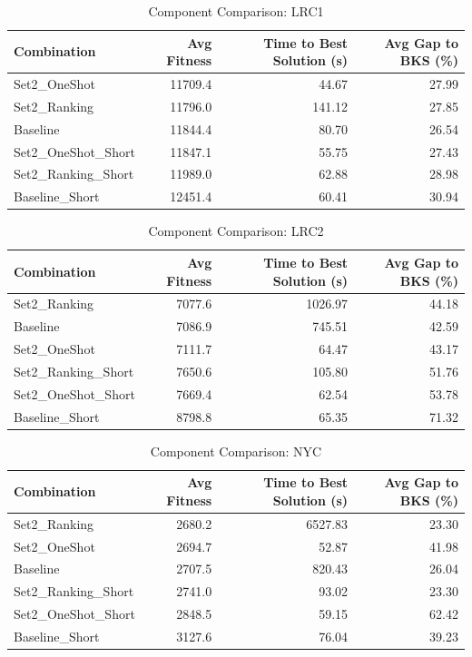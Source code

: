 \documentclass{article}
\begin{document}
\begin{table}[htbp]
\centering
\caption{Component Comparison: LRC1}
\label{tab:comparison_lrc1}
\begin{tabular}{lrrr}
\toprule
Combination & Avg Fitness & Time to Best Solution (s) & Avg Gap to BKS (\%) \\
\midrule
Set2\_OneShot & 11709.4 & 44.67 & 27.99 \\
Set2\_Ranking & 11796.0 & 141.12 & 27.85 \\
Baseline & 11844.4 & 80.70 & 26.54 \\
Set2\_OneShot\_Short & 11847.1 & 55.75 & 27.43 \\
Set2\_Ranking\_Short & 11989.0 & 62.88 & 28.98 \\
Baseline\_Short & 12451.4 & 60.41 & 30.94 \\
\bottomrule
\end{tabular}
\end{table}

\begin{table}[htbp]
\centering
\caption{Component Comparison: LRC2}
\label{tab:comparison_lrc2}
\begin{tabular}{lrrr}
\toprule
Combination & Avg Fitness & Time to Best Solution (s) & Avg Gap to BKS (\%) \\
\midrule
Set2\_Ranking & 7077.6 & 1026.97 & 44.18 \\
Baseline & 7086.9 & 745.51 & 42.59 \\
Set2\_OneShot & 7111.7 & 64.47 & 43.17 \\
Set2\_Ranking\_Short & 7650.6 & 105.80 & 51.76 \\
Set2\_OneShot\_Short & 7669.4 & 62.54 & 53.78 \\
Baseline\_Short & 8798.8 & 65.35 & 71.32 \\
\bottomrule
\end{tabular}
\end{table}

\begin{table}[htbp]
\centering
\caption{Component Comparison: NYC}
\label{tab:comparison_nyc}
\begin{tabular}{lrrr}
\toprule
Combination & Avg Fitness & Time to Best Solution (s) & Avg Gap to BKS (\%) \\
\midrule
Set2\_Ranking & 2680.2 & 6527.83 & 23.30 \\
Set2\_OneShot & 2694.7 & 52.87 & 41.98 \\
Baseline & 2707.5 & 820.43 & 26.04 \\
Set2\_Ranking\_Short & 2741.0 & 93.02 & 23.30 \\
Set2\_OneShot\_Short & 2848.5 & 59.15 & 62.42 \\
Baseline\_Short & 3127.6 & 76.04 & 39.23 \\
\bottomrule
\end{tabular}
\end{table}
\end{document}
